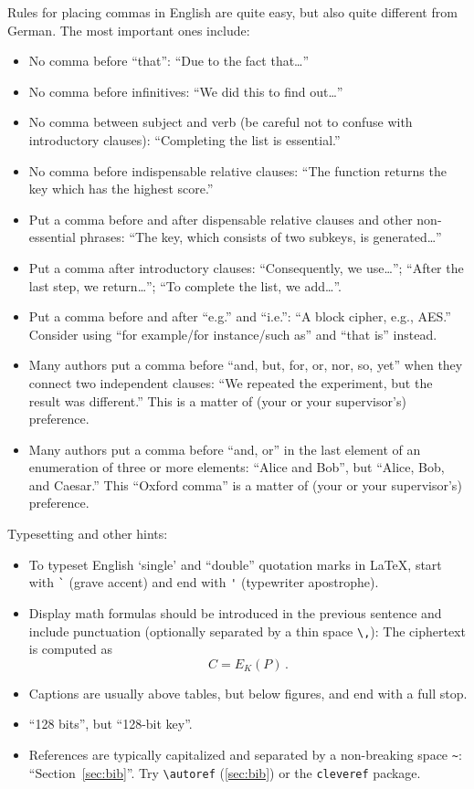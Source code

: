 \documentclass[11pt,
  titlepage=false,
]{scrreprt}
\begin{document}
Rules for placing commas in English are quite easy, but also quite different from German.
The most important ones include:
\begin{itemize}
  \item No comma before ``that'': ``Due to the fact that\dots''
  \item No comma before infinitives: ``We did this to find out\dots''
  \item No comma between subject and verb (be careful not to confuse with introductory clauses): ``Completing the list is essential.''
  \item No comma before indispensable relative clauses: ``The function returns the key which has the highest score.''
  \item Put a comma before and after dispensable relative clauses and other non-essential phrases: ``The key, which consists of two subkeys, is generated\dots''
  \item Put a comma after introductory clauses: ``Consequently, we use\dots''; ``After the last step, we return\dots''; ``To complete the list, we add\dots''.
  \item Put a comma before and after ``e.g.'' and ``i.e.'': ``A block cipher, e.g., AES.''
    Consider using ``for example/for instance/such as'' and ``that is'' instead.
  \item Many authors put a comma before ``and, but, for, or, nor, so, yet'' when they connect two independent clauses: ``We repeated the experiment, but the result was different.''
    This is a matter of (your or your supervisor's) preference.
  \item Many authors put a comma before ``and, or'' in the last element of an enumeration of three or more elements: ``Alice and Bob'', but ``Alice, Bob, and Caesar.''
    This ``Oxford comma'' is a matter of (your or your supervisor's) preference.
\end{itemize}

Typesetting and other hints:
\begin{itemize}
  \item To typeset English `single' and ``double'' quotation marks in \LaTeX, start with \verb|`| (grave accent) and end with \verb|'| (typewriter apostrophe).
  \item Display math formulas should be introduced in the previous sentence and include punctuation (optionally separated by a thin space \verb|\,|): The ciphertext is computed as
    \[C = E_K(P)\,.\]
  \item Captions are usually above tables, but below figures, and end with a full stop.
  \item ``128 bits'', but ``128-bit key''.
  \item References are typically capitalized and separated by a non-breaking space \verb|~|: ``Section~\ref{sec:bib}''.
    Try \verb|\autoref| (\autoref{sec:bib}) or the \verb|cleveref| package. %
\end{itemize}
\end{document}

